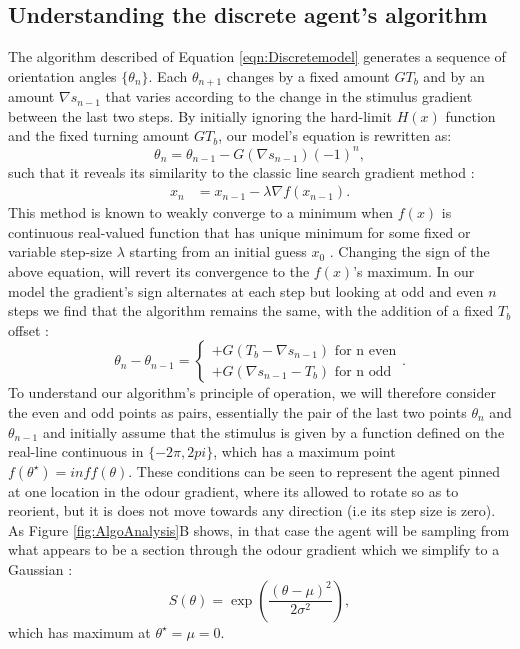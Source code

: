 \documentclass[10pt,a4paper]{article}
\begin{document}
\subsection{Understanding the discrete agent's algorithm}
\label{sec:AlgoExplain}
The algorithm described of Equation \eqref{eqn:Discretemodel} generates a sequence of orientation angles $\{\theta_n\}$. Each $\theta_{n+1}$ changes by a fixed amount $G T_b$ and by an amount $\nabla s_{n-1}$ that varies according to the change in the stimulus gradient between  the last two steps.
By initially ignoring the hard-limit $H(x)$ function  and the fixed turning amount $G T_b$, our model's equation is rewritten as:
\begin{equation}
 \theta_n = \theta_{n-1} - G (\nabla s_{n-1}){(-1)}^n,
\end{equation}
such that it reveals its similarity to the classic line search gradient method :
\begin{align}
x_n &= x_{n-1} - \lambda \nabla f(x_{n-1}).
\label{eqn:graddescent}
\end{align}
This method is known to weakly converge to a minimum when $f(x)$ is continuous real-valued function that has unique minimum for some fixed or variable step-size $\lambda$ starting from an initial guess $x_0$ \citep{armijo1966minimization}. Changing the sign of the above equation, will revert its convergence to the $f(x)$'s maximum. In our model the gradient's sign alternates at each step but looking at odd and even $n$ steps we find that the algorithm remains the same, with the addition of a fixed $T_b$ offset :
\begin{equation}
\theta_n - \theta_{n-1} = 
\begin{cases}
+G (T_b - \nabla s_{n-1}) \mbox { for n even}\\
+G (\nabla s_{n-1}-T_b) \mbox { for n odd}
\end{cases}.
\label{eq:oddevenPairs}
\end{equation}
 To understand our algorithm's principle of operation, we will therefore consider the even and odd points as pairs, essentially the pair of the last two points $\theta_n$ and $\theta_{n-1}$ and  initially assume that the stimulus is given by a function defined on the real-line continuous in $\{-2 \pi , 2 pi\}$, which has a maximum point $f(\theta^\star)=inf f(\theta)$.
  These conditions can be seen to represent the agent pinned at one location in the odour gradient, where its allowed to rotate so as to reorient, but it is does not move towards any direction (i.e its step size is zero). As Figure \ref{fig:AlgoAnalysis}B shows, in that case the agent will be sampling from what appears to be a section through the odour gradient which we simplify to a Gaussian :
\begin{equation}
S(\theta) = \exp\left({\frac{(\theta-\mu)^2}{2 \sigma^2}}\right),
\end{equation}
which has maximum at $\theta^\star = \mu =0$.
\end{document}
